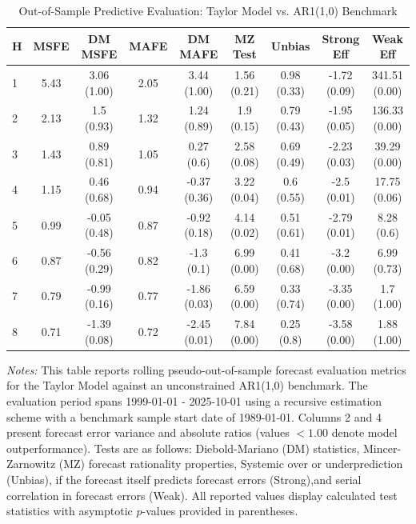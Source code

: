 \begin{table}[htbp]
\centering
\caption{Out-of-Sample Predictive Evaluation: Taylor Model vs. AR1(1,0) Benchmark}
\label{tab:taylor_model_evaluation}
\footnotesize
\begin{tabular}{l cccccccc}
\hline\hline
\rule{0pt}{3ex}
\textbf{H} & \textbf{MSFE} & \textbf{DM MSFE} & \textbf{MAFE} & \textbf{DM MAFE} & \textbf{MZ Test} & \textbf{Unbias} & \textbf{Strong Eff} & \textbf{Weak Eff} \\[0.5ex]
\hline
\rule{0pt}{2.5ex}
1 & 5.43 & 3.06 (1.00) & 2.05 & 3.44 (1.00) & 1.56 (0.21) & 0.98 (0.33) & -1.72 (0.09) & 341.51 (0.00) \\
2 & 2.13 & 1.5 (0.93) & 1.32 & 1.24 (0.89) & 1.9 (0.15) & 0.79 (0.43) & -1.95 (0.05) & 136.33 (0.00) \\
3 & 1.43 & 0.89 (0.81) & 1.05 & 0.27 (0.6) & 2.58 (0.08) & 0.69 (0.49) & -2.23 (0.03) & 39.29 (0.00) \\
4 & 1.15 & 0.46 (0.68) & 0.94 & -0.37 (0.36) & 3.22 (0.04) & 0.6 (0.55) & -2.5 (0.01) & 17.75 (0.06) \\
5 & 0.99 & -0.05 (0.48) & 0.87 & -0.92 (0.18) & 4.14 (0.02) & 0.51 (0.61) & -2.79 (0.01) & 8.28 (0.6) \\
6 & 0.87 & -0.56 (0.29) & 0.82 & -1.3 (0.1) & 6.99 (0.00) & 0.41 (0.68) & -3.2 (0.00) & 6.99 (0.73) \\
7 & 0.79 & -0.99 (0.16) & 0.77 & -1.86 (0.03) & 6.59 (0.00) & 0.33 (0.74) & -3.35 (0.00) & 1.7 (1.00) \\
8 & 0.71 & -1.39 (0.08) & 0.72 & -2.45 (0.01) & 7.84 (0.00) & 0.25 (0.8) & -3.58 (0.00) & 1.88 (1.00) \\
\hline\hline
\end{tabular}%
\par\smallskip
\parbox{\textwidth}{\scriptsize \textit{Notes:} This table reports rolling pseudo-out-of-sample forecast evaluation metrics for the Taylor Model against an unconstrained AR1(1,0) benchmark. The evaluation period spans 1999-01-01 - 2025-10-01 using a recursive estimation scheme with a benchmark sample start date of 1989-01-01. Columns 2 and 4 present forecast error variance and absolute ratios (values $< 1.00$ denote model outperformance). Tests are as follows: Diebold-Mariano (DM) statistics, Mincer-Zarnowitz (MZ) forecast rationality properties, Systemic over or underprediction (Unbias), if the forecast itself predicts forecast errors (Strong),and serial correlation in forecast errors (Weak). All reported values display calculated test statistics with asymptotic $p$-values provided in parentheses.}
\end{table}
